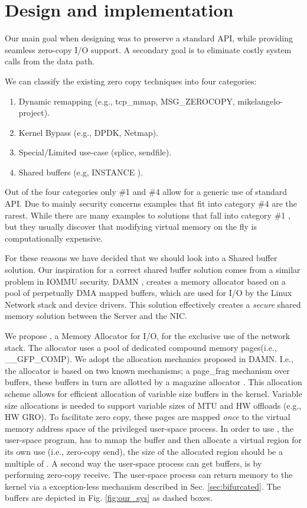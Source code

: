 
\section{Design and implementation}
Our main goal when designing \oursys was to preserve a standard \sockets API, while providing seamless zero-copy I/O support. A secondary goal is to eliminate costly system calls from the data path. 

We can classify the existing zero copy techniques into four categories:
\begin{enumerate}
    \item Dynamic remapping (e.g., tcp\_mmap, MSG\_ZEROCOPY\cite{desendmsg}, mikelangelo-project\cite{mikelangelo}).
    \item Kernel Bypass (e.g., DPDK, Netmap\cite{rizzo2012netmap}).
    \item Special/Limited use-case (splice, sendfile).
    \item Shared buffers (e.g, INSTANCE \cite{instance}).
\end{enumerate}
Out of the four categories only \#1 and \#4 allow for a generic use of standard \sockets API. Due to mainly security concerns examples that fit into category \#4 are the rarest.
While there are many examples to solutions that fall into category \#1 \cite{mikelangelo-empty,desendmsg}, but they usually discover that modifying virtual memory on the fly is computationally expensive. 

For these reasons we have decided that we should look into a Shared buffer solution. Our inspiration for a correct shared buffer solution comes from a similar problem in IOMMU security. DAMN \cite{markuze2018damn}, creates a memory allocator based on a pool of perpetually DMA mapped buffers, which are used for I/O by the Linux Network stack and device drivers. This solution effectively creates a \emph{secure} shared memory solution between the Server and the NIC.

We propose \oursys, a Memory Allocator for I/O, for the  exclusive use of the network stack. The \oursys allocator uses a pool of dedicated compound memory pages(i.e., \_\_GFP\_COMP). We adopt the allocation mechanics proposed in DAMN\cite{markuze2018damn}. I.e., the allocator is based on two known mechanisms; a page\_frag mechanism \cite{pagefrag} over \size buffers, these buffers in turn are allotted by a magazine allocator \cite{bonwick2001magazines}. This allocation scheme allows for efficient allocation of variable size buffers in the kernel. Variable size allocations is needed to support variable sizes of MTU and HW offloads (e.g., HW GRO). 
To facilitate zero copy, these pages are mapped \emph{once} to the virtual memory address space of the privileged user-space process. In order to use \oursys, the user-space program, has to mmap the \oursys buffer and then allocate a virtual region for its own use (i.e., zero-copy send), the size of the allocated region should be a multiple of \size. A second way the user-space process can get \oursys buffers, is by performing zero-copy receive. The user-space process can return memory to the kernel via a exception-less mechanism described in Sec. \ref{sec:bifurcated}.
The \oursys buffers are depicted in Fig. \ref{fig:our_sys} as dashed boxes.
